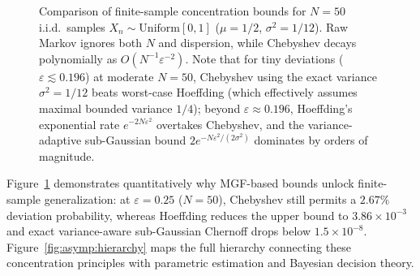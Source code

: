 \documentclass[../../../../master.tex]{subfiles}
\begin{document}
\begin{figure}[htbp]
\caption{Comparison of finite-sample concentration bounds for $N = 50$ i.i.d.\ samples $X_n \sim \mathrm{Uniform}[0, 1]$ ($\mu = 1/2$, $\sigma^2 = 1/12$). Raw Markov ignores both $N$ and dispersion, while Chebyshev decays polynomially as $O(N^{-1}\varepsilon^{-2})$. Note that for tiny deviations ($\varepsilon \lesssim 0.196$) at moderate $N=50$, Chebyshev using the exact variance $\sigma^2 = 1/12$ beats worst-case Hoeffding (which effectively assumes maximal bounded variance $1/4$); beyond $\varepsilon \approx 0.196$, Hoeffding's exponential rate $e^{-2N\varepsilon^2}$ overtakes Chebyshev, and the variance-adaptive sub-Gaussian bound $2e^{-N\varepsilon^2/(2\sigma^2)}$ dominates by orders of magnitude.}
\label{fig:asymp:tailbounds}
\end{figure}

Figure~\ref{fig:asymp:tailbounds} demonstrates quantitatively why MGF-based bounds unlock finite-sample generalization: at $\varepsilon = 0.25$ ($N=50$), Chebyshev still permits a $2.67\%$ deviation probability, whereas Hoeffding reduces the upper bound to $3.86 \times 10^{-3}$ and exact variance-aware sub-Gaussian Chernoff drops below $1.5 \times 10^{-8}$. Figure~\ref{fig:asymp:hierarchy} maps the full hierarchy connecting these concentration principles with parametric estimation and Bayesian decision theory.
\end{document}
